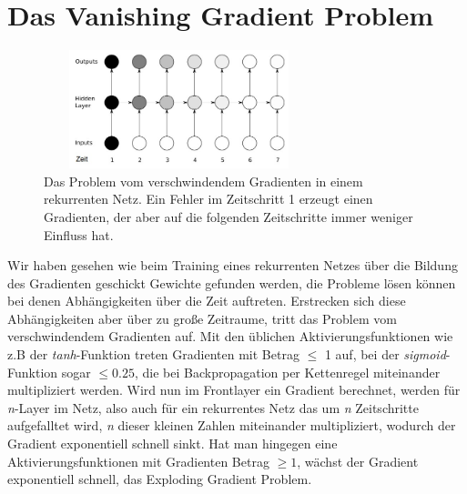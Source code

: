 \section{Das Vanishing Gradient Problem}
\begin{figure}
	\centering
	\includegraphics[width=0.7\textwidth, height=130px]{pics/vgp.jpg}	
	\caption{Das Problem vom verschwindendem Gradienten in einem rekurrenten Netz. Ein Fehler im Zeitschritt 1 erzeugt einen Gradienten, der aber auf die folgenden Zeitschritte immer weniger Einfluss hat.\cite{bib:vgp}}
	\label{img:vgp}
\end{figure}
Wir haben gesehen wie beim Training eines rekurrenten Netzes über die Bildung des Gradienten geschickt Gewichte gefunden werden, die Probleme lösen können bei denen Abhängigkeiten über die Zeit auftreten. Erstrecken sich diese Abhängigkeiten aber über zu große Zeitraume, tritt das Problem vom verschwindendem Gradienten auf. Mit den üblichen Aktivierungsfunktionen wie z.B der \textit{tanh}-Funktion treten Gradienten mit Betrag \(\leq\) 1 auf, bei der \textit{sigmoid}-Funktion sogar \(\leq 0.25\), die bei Backpropagation per Kettenregel miteinander multipliziert werden. Wird nun im Frontlayer ein Gradient berechnet, werden für \textit{n}-Layer im Netz, also auch für ein rekurrentes Netz das um \textit{n} Zeitschritte aufgefalltet wird, \textit{n} dieser kleinen Zahlen miteinander multipliziert, wodurch der Gradient exponentiell schnell sinkt. Hat man hingegen eine Aktivierungsfunktionen mit Gradienten Betrag \(\geq 1\), wächst der Gradient exponentiell schnell, das Exploding Gradient Problem.

